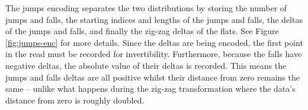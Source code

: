 The jumps encoding separates the two distributions by storing the number of
jumps and falls, the starting indices and lengths of the jumps and falls, the
deltas of the jumps and falls, and finally the zig-zag deltas of the flats. See
Figure \ref{fig:jumps-enc} for more details. Since the deltas are being encoded,
the first point in the read must be recorded for invertibility. Furthermore,
because the falls have negative deltas, the absolute value of their deltas is
recorded. This means the jumps and falls deltas are all positive whilst their
distance from zero remains the same -- unlike what happens during the zig-zag
transformation where the data's distance from zero is roughly doubled.






